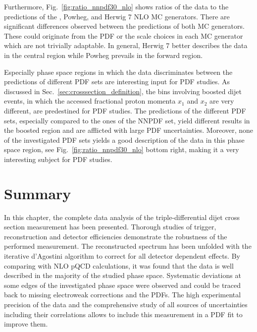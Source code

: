 Furthermore, Fig.~\ref{fig:ratio_nnpdf30_nlo} shows ratios of the data to the predictions of
the \NLOJETPP, Powheg, and Herwig 7 NLO MC generators. There are significant differences
observed between the predictions of both MC generators. These could originate
from the PDF or the scale choices in each MC generator which are
not trivially adaptable. In general, Herwig 7 better describes the data in the
central region while Powheg prevails in the forward region.

Especially phase space regions in which the data discriminates between the
predictions of different PDF sets are interesting input for PDF studies. As
discussed in Sec.~\ref{sec:crosssection_definition}, the bins involving boosted
dijet events, in which the accessed fractional proton momenta $x_1$ and $x_2$
are very different, are predestined for PDF studies. The predictions of the
different PDF sets, especially compared to the ones of the NNPDF set, yield
different results in the boosted region and are afflicted with large PDF
uncertainties. Moreover, none of the investigated PDF sets yields a good
description of the data in this phase space region, see
Fig.~\ref{fig:ratio_nnpdf30_nlo} bottom right, making it a very interesting
subject for PDF studies.

\section{Summary}

In this chapter, the complete data analysis of the triple-differential dijet
cross section measurement has been presented. Thorough studies of trigger,
reconstruction and detector efficiencies demonstrate the robustness of the
performed measurement. The reconstructed spectrum has been unfolded with the
iterative d'Agostini algorithm to correct for all detector dependent effects. By
comparing with NLO pQCD calculations, it was found that the data is well
described in the majority of the studied phase space.  Systematic deviations at
some edges of the investigated phase space were observed and could be traced
back to missing electroweak corrections and the PDFs. The high experimental
precision of the data and the comprehensive study of all sources of
uncertainties including their correlations allows to include this measurement in
a PDF fit to improve them.

